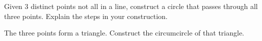 \documentclass[nooutcomes]{ximera}
\begin{document}
\begin{problem}
Given 3 distinct points not all in a line, construct a circle
  that passes through all three points. Explain the steps in your
  construction.
\begin{freeResponse}
\begin{hint}
The three points form a triangle.  Construct the circumcircle of that triangle.  
\end{hint}
\end{freeResponse}
\end{problem}
\end{document}
